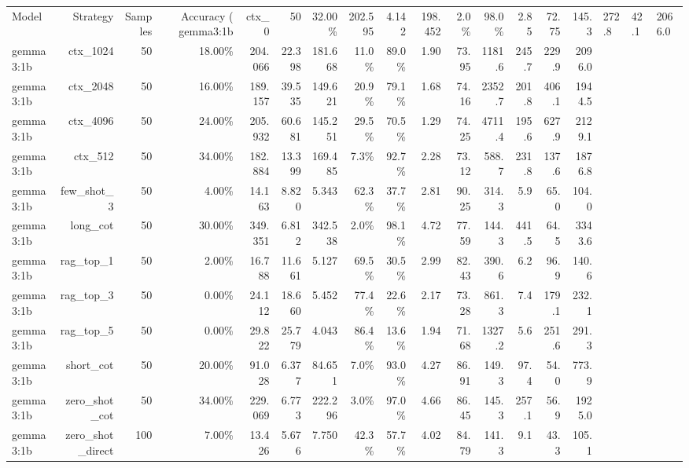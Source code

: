 \begin{table}[t]
\centering
\small
\begin{tabular}{lrrrrrrrrrrrrrr}
\toprule
Model & Strategy & Samples & Accuracy (%
\midrule
gemma3:1b & ctx\_0 & 50 & 32.00\% & 202.595 & 4.142 & 198.452 & 2.0\% & 98.0\% & 2.85 & 72.75 & 145.3 & 272.8 & 42.1 & 2066.0 \\
gemma3:1b & ctx\_1024 & 50 & 18.00\% & 204.066 & 22.398 & 181.668 & 11.0\% & 89.0\% & 1.90 & 73.95 & 1181.6 & 245.7 & 229.9 & 2096.0 \\
gemma3:1b & ctx\_2048 & 50 & 16.00\% & 189.157 & 39.535 & 149.621 & 20.9\% & 79.1\% & 1.68 & 74.16 & 2352.7 & 201.8 & 406.1 & 1944.5 \\
gemma3:1b & ctx\_4096 & 50 & 24.00\% & 205.932 & 60.681 & 145.251 & 29.5\% & 70.5\% & 1.29 & 74.25 & 4711.4 & 195.6 & 627.9 & 2129.1 \\
gemma3:1b & ctx\_512 & 50 & 34.00\% & 182.884 & 13.399 & 169.485 & 7.3\% & 92.7\% & 2.28 & 73.12 & 588.7 & 231.8 & 137.6 & 1876.8 \\
gemma3:1b & few\_shot\_3 & 50 & 4.00\% & 14.163 & 8.820 & 5.343 & 62.3\% & 37.7\% & 2.81 & 90.25 & 314.3 & 5.9 & 65.0 & 104.0 \\
gemma3:1b & long\_cot & 50 & 30.00\% & 349.351 & 6.812 & 342.538 & 2.0\% & 98.1\% & 4.72 & 77.59 & 144.3 & 441.5 & 64.5 & 3343.6 \\
gemma3:1b & rag\_top\_1 & 50 & 2.00\% & 16.788 & 11.661 & 5.127 & 69.5\% & 30.5\% & 2.99 & 82.43 & 390.6 & 6.2 & 96.9 & 140.6 \\
gemma3:1b & rag\_top\_3 & 50 & 0.00\% & 24.112 & 18.660 & 5.452 & 77.4\% & 22.6\% & 2.17 & 73.28 & 861.3 & 7.4 & 179.1 & 232.1 \\
gemma3:1b & rag\_top\_5 & 50 & 0.00\% & 29.822 & 25.779 & 4.043 & 86.4\% & 13.6\% & 1.94 & 71.68 & 1327.2 & 5.6 & 251.6 & 291.3 \\
gemma3:1b & short\_cot & 50 & 20.00\% & 91.028 & 6.377 & 84.651 & 7.0\% & 93.0\% & 4.27 & 86.91 & 149.3 & 97.4 & 54.0 & 773.9 \\
gemma3:1b & zero\_shot\_cot & 50 & 34.00\% & 229.069 & 6.773 & 222.296 & 3.0\% & 97.0\% & 4.66 & 86.45 & 145.3 & 257.1 & 56.9 & 1925.0 \\
gemma3:1b & zero\_shot\_direct & 100 & 7.00\% & 13.426 & 5.676 & 7.750 & 42.3\% & 57.7\% & 4.02 & 84.79 & 141.3 & 9.1 & 43.3 & 105.1 \\

\end{tabular}
\end{table}
